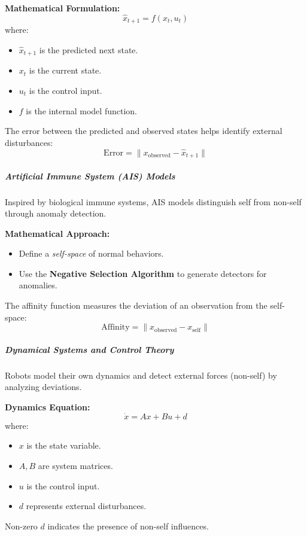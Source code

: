 \documentclass{book}
\begin{document}
\textbf{Mathematical Formulation:}
\begin{equation}
    \hat{x}_{t+1} = f(x_t, u_t)
\end{equation}
where:
\begin{itemize}
    \item \( \hat{x}_{t+1} \) is the predicted next state.
    \item \( x_t \) is the current state.
    \item \( u_t \) is the control input.
    \item \( f \) is the internal model function.
\end{itemize}
The error between the predicted and observed states helps identify external disturbances:
\begin{equation}
    \text{Error} = \| x_{\text{observed}} - \hat{x}_{t+1} \|
\end{equation}

\subparagraph{Artificial Immune System (AIS) Models}
Inspired by biological immune systems, AIS models distinguish self from non-self through anomaly detection.

\textbf{Mathematical Approach:}
\begin{itemize}
    \item Define a \textit{self-space} of normal behaviors.
    \item Use the \textbf{Negative Selection Algorithm} to generate detectors for anomalies.
\end{itemize}

The affinity function measures the deviation of an observation from the self-space:
\begin{equation}
    \text{Affinity} = \| x_{\text{observed}} - x_{\text{self}} \|
\end{equation}

\subparagraph{Dynamical Systems and Control Theory}
Robots model their own dynamics and detect external forces (non-self) by analyzing deviations.

\textbf{Dynamics Equation:}
\begin{equation}
    \dot{x} = Ax + Bu + d
\end{equation}
where:
\begin{itemize}
    \item \( x \) is the state variable.
    \item \( A, B \) are system matrices.
    \item \( u \) is the control input.
    \item \( d \) represents external disturbances.
\end{itemize}
Non-zero \( d \) indicates the presence of non-self influences.
\end{document}
